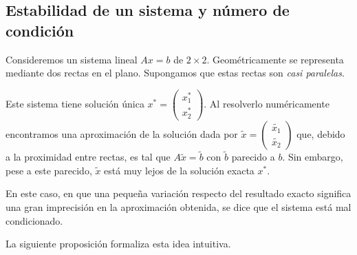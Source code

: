 \subsection{Estabilidad de un sistema y número de condición}

Consideremos un sistema lineal $Ax = b$ de $2 \times 2$. Geométricamente se representa mediante dos rectas en el plano. Supongamos que estas rectas son \textit{casi paralelas}.

\begin{figure}[h]
\centering

\end{figure}

Este sistema tiene solución única $x^{*} = \begin{pmatrix}x_1^* \\ x_2^*\end{pmatrix}$. Al resolverlo numéricamente encontramos una aproximación de la solución dada por $\tilde{x} = \begin{pmatrix}\tilde{x_1} \\ \tilde{x_2}\end{pmatrix}$ que, debido a la proximidad entre rectas, es tal que $A\tilde{x} = \tilde{b}$ con $\tilde{b}$ parecido a $b$. Sin embargo, pese a este parecido, $\tilde{x}$ está muy lejos de la solución exacta $x^{*}$.

En este caso, en que una pequeña variación respecto del resultado exacto significa una gran imprecisión en la aproximación obtenida, se dice que el sistema está mal condicionado.

La siguiente proposición formaliza esta idea intuitiva.

